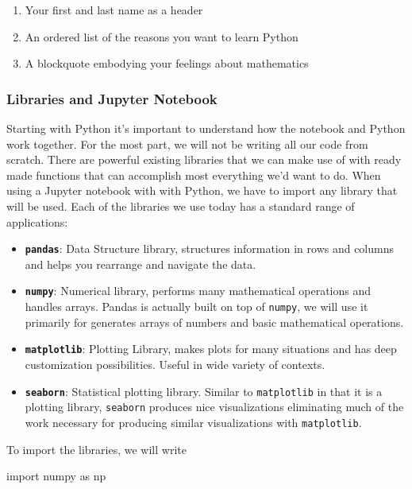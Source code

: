 \documentclass[11pt]{article}
\providecommand{\tightlist}{%
      \setlength{\itemsep}{0pt}\setlength{\parskip}{0pt}}
\newenvironment{Shaded}{}{}
\newcommand{\NormalTok}[1]{{#1}}
\newcommand{\ImportTok}[1]{{#1}}
\begin{document}
\begin{enumerate}
\def\labelenumi{\arabic{enumi}.}
\tightlist
\item
  Your first and last name as a header
\item
  An ordered list of the reasons you want to learn Python
\item
  A blockquote embodying your feelings about mathematics
\end{enumerate}

    \subsubsection{Libraries and Jupyter
Notebook}\label{libraries-and-jupyter-notebook}

Starting with Python it's important to understand how the notebook and
Python work together. For the most part, we will not be writing all our
code from scratch. There are powerful existing libraries that we can
make use of with ready made functions that can accomplish most
everything we'd want to do. When using a Jupyter notebook with with
Python, we have to import any library that will be used. Each of the
libraries we use today has a standard range of applications:

\begin{itemize}
\tightlist
\item
  \textbf{\texttt{pandas}}: Data Structure library, structures
  information in rows and columns and helps you rearrange and navigate
  the data.
\item
  \textbf{\texttt{numpy}}: Numerical library, performs many mathematical
  operations and handles arrays. Pandas is actually built on top of
  \texttt{numpy}, we will use it primarily for generates arrays of
  numbers and basic mathematical operations.
\item
  \textbf{\texttt{matplotlib}}: Plotting Library, makes plots for many
  situations and has deep customization possibilities. Useful in wide
  variety of contexts.
\item
  \textbf{\texttt{seaborn}}: Statistical plotting library. Similar to
  \texttt{matplotlib} in that it is a plotting library, \texttt{seaborn}
  produces nice visualizations eliminating much of the work necessary
  for producing similar visualizations with \texttt{matplotlib}.
\end{itemize}

To import the libraries, we will write

\begin{Shaded}
\begin{Highlighting}[]
\ImportTok{import}\NormalTok{ numpy }\ImportTok{as}\NormalTok{ np}
\end{Highlighting}
\end{Shaded}
\end{document}

